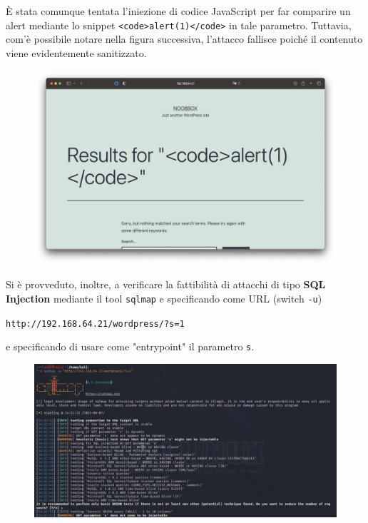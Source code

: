 \documentclass[a4paper, 12pt, oneside]{article}
\begin{document}
È stata comunque tentata l'iniezione di codice JavaScript per far comparire un alert mediante lo snippet \texttt{<code>alert(1)</code>} in tale parametro. Tuttavia, com'è possibile notare nella figura successiva, l'attacco fallisce poiché il contenuto viene evidentemente sanitizzato.

\begin{figure}[h!]
    \centering
    \includegraphics[width=\textwidth]{img/xss.png}
\end{figure}

\newpage
Si è provveduto, inoltre, a verificare la fattibilità di attacchi di tipo \textbf{SQL Injection} mediante il tool \texttt{sqlmap} e specificando come URL (switch \texttt{-u})

\begin{center}
    \texttt{http://192.168.64.21/wordpress/?s=1}
\end{center}

e specificando di usare come "entrypoint" il parametro \texttt{s}.

\begin{figure}[h!]
    \centering
    \includegraphics[width=\textwidth]{img/sqlmap.png}
\end{figure}
\end{document}
